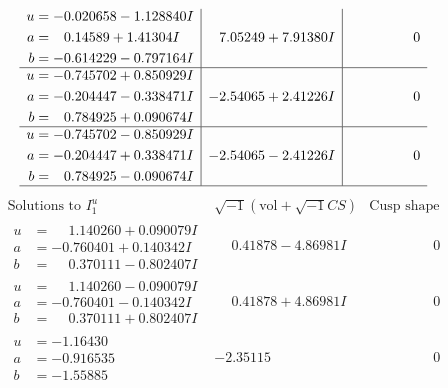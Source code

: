 \documentclass[1p]{elsarticle_modified}
\theoremstyle{definition}
\newcommand{\I}{\sqrt{-1}}
\begin{document}
$$\begin{array}{c|c|c}
\begin{aligned}
u &= -0.020658 - 1.128840 I \\
a &= \phantom{-}0.14589 + 1.41304 I \\
b &= -0.614229 - 0.797164 I\end{aligned}
 & \phantom{-}7.05249 + 7.91380 I & \phantom{-0.000000 } 0 \\ \hline\begin{aligned}
u &= -0.745702 + 0.850929 I \\
a &= -0.204447 - 0.338471 I \\
b &= \phantom{-}0.784925 + 0.090674 I\end{aligned}
 & -2.54065 + 2.41226 I & \phantom{-0.000000 } 0 \\ \hline\begin{aligned}
u &= -0.745702 - 0.850929 I \\
a &= -0.204447 + 0.338471 I \\
b &= \phantom{-}0.784925 - 0.090674 I\end{aligned}
 & -2.54065 - 2.41226 I & \phantom{-0.000000 } 0\\
 \hline 
 \end{array}$$\newpage$$\begin{array}{c|c|c}  
\text{Solutions to }I^u_{1}& \I (\text{vol} + \sqrt{-1}CS) & \text{Cusp shape}\\
 \hline 
\begin{aligned}
u &= \phantom{-}1.140260 + 0.090079 I \\
a &= -0.760401 + 0.140342 I \\
b &= \phantom{-}0.370111 - 0.802407 I\end{aligned}
 & \phantom{-}0.41878 - 4.86981 I & \phantom{-0.000000 } 0 \\ \hline\begin{aligned}
u &= \phantom{-}1.140260 - 0.090079 I \\
a &= -0.760401 - 0.140342 I \\
b &= \phantom{-}0.370111 + 0.802407 I\end{aligned}
 & \phantom{-}0.41878 + 4.86981 I & \phantom{-0.000000 } 0 \\ \hline\begin{aligned}
u &= -1.16430\phantom{ +0.000000I} \\
a &= -0.916535\phantom{ +0.000000I} \\
b &= -1.55885\phantom{ +0.000000I}\end{aligned}
 & -2.35115\phantom{ +0.000000I} & \phantom{-0.000000 } 0 \\ \hline\begin{aligned}

\end{aligned}
\end{array}$$
\end{document}
